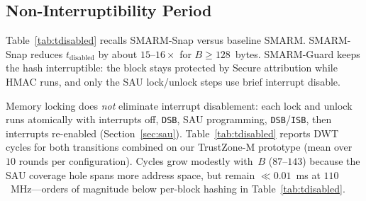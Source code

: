 \documentclass[conference]{IEEEtran}
\newcommand{\tdis}{$t_{\mathrm{disabled}}$\xspace}
\newcommand{\smarmcopy}{SMARM-Snap\xspace}
\newcommand{\smarmlock}{SMARM-Guard\xspace}
\begin{document}
\subsection{Non-Interruptibility Period}

Table~\ref{tab:tdisabled} recalls \smarmcopy versus baseline SMARM.
\smarmcopy reduces \tdis by about $15$--$16\times$ for $B\geq 128$~bytes. 
\smarmlock{} keeps the hash interruptible: the block stays
protected by Secure attribution while HMAC runs, and only the SAU
lock/unlock steps use brief interrupt disable.

Memory locking does \emph{not} eliminate interrupt disablement: each
lock and unlock runs atomically with interrupts off, \texttt{DSB}, SAU
programming, \texttt{DSB}/\texttt{ISB}, then interrupts re-enabled
(Section~\ref{sec:sau}). Table~\ref{tab:tdisabled} reports DWT cycles
for both transitions combined on our TrustZone-M prototype (mean over
$10$ rounds per configuration). Cycles grow modestly with~$B$
($87$--$143$) because the SAU coverage hole spans more address space,
but remain $\ll 0.01$~ms at $110$~MHz---orders of magnitude below
per-block hashing in Table~\ref{tab:tdisabled}.

\end{document}
